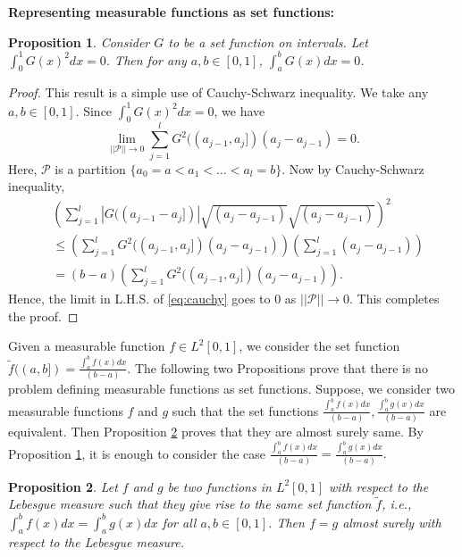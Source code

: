 \documentclass[reqno,12pt]{amsart}
\theoremstyle{plain}
\newtheorem{proposition}{Proposition}
\theoremstyle{definition}
\let\tilde\widetilde
\begin{document}
\noindent
\textbf{Representing measurable functions as set functions:}\\
\begin{proposition}\label{prop:zero}
    Consider $G$ to be a set function on intervals. Let $\int_{0}^{1} G(x)^{2} dx =0$. Then for any $a,b \in [0,1]$, $\int_{a}^{b}G(x)dx=0$.
\end{proposition}
\begin{proof}
    This result is a simple use of Cauchy-Schwarz inequality. We take any $a,b \in [0,1]$. Since $\int_{0}^{1} G(x)^{2}dx = 0$, we have 
    \[
    \lim_{||\mathcal{P}||\to 0} \sum_{j=1}^{l} G^2((a_{j-1},a_{j}])(a_{j}-a_{j-1}) = 0.
    \]
    Here, $\mathcal{P}$ is a partition $\{ a_{0}=a< a_{1}< \ldots <a_{l}=b \}$. Now by Cauchy-Schwarz inequality, 
    \begin{equation}\label{eq:cauchy}
        \begin{split}
            &\left(\sum_{j=1}^{l} \left|G((a_{j-1}-a_{j}])\right|\sqrt{(a_{j}-a_{j-1})}\sqrt{(a_{j}-a_{j-1})}\right)^2\\
            & \le \left( \sum_{j=1}^{l} G^{2}((a_{j-1},a_{j}]) (a_{j}-a_{j-1}) \right)\left(\sum_{j=1}^{l}(a_{j}-a_{j-1})\right)\\
            &=(b-a) \left( \sum_{j=1}^{l} G^{2}((a_{j-1},a_{j}]) (a_{j}-a_{j-1}) \right).
        \end{split}
    \end{equation}
    Hence, the limit in L.H.S. of \eqref{eq:cauchy} goes to $0$ as $||\mathcal{P}||\to 0$. This completes the proof.
\end{proof}
Given a measurable function $f \in L^{2}[0,1]$, we consider the set function $\tilde{f}((a,b])= \frac{\int_{a}^{b}f(x)dx}{(b-a)}$.
The following two Propositions prove that there is no problem defining measurable functions as set functions. Suppose, we consider two measurable functions $f$ and $g$ such that the set functions $\frac{\int_{a}^{b}f(x)dx}{(b-a)}, \frac{\int_{a}^{b}g(x)dx}{(b-a)}$ are equivalent. Then Proposition \ref{prop:well} proves that they are almost surely same. By Proposition \ref{prop:zero}, it is enough to consider the case 
$\frac{\int_{a}^{b}f(x)dx}{(b-a)}= \frac{\int_{a}^{b}g(x)dx}{(b-a)}.$ 
\begin{proposition}\label{prop:well}
Let $f$ and $g$ be two functions in $L^2[0,1]$ with respect to the Lebesgue measure such that they give rise to the same set function $\tilde{f}$, i.e., $\int_{a}^{b} f(x) dx= \int_{a}^{b} g(x) dx$ for all $a,b \in [0,1]$. Then $f= g$ almost surely with respect to the Lebesgue measure.
\end{proposition}
\end{document}
